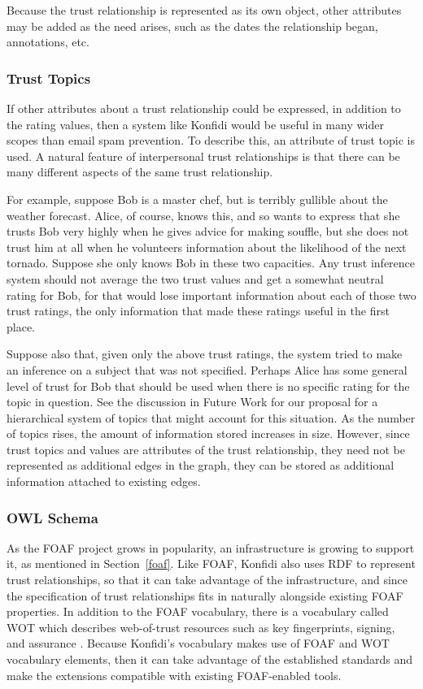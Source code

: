 \documentclass[letterpaper]{www2006-submission}
\begin{document}
Because the trust relationship is represented as its own object, other attributes may be added as the need arises, such as the dates the relationship began, annotations, etc. 

\subsubsection{Trust Topics}
If other attributes about a trust relationship could be expressed, in addition to the rating values, then a system like Konfidi would be useful in many wider scopes than email spam prevention.  To describe this, an attribute of trust topic is used.  A natural feature of interpersonal trust relationships is that there can be many different aspects of the same trust relationship.  

For example, suppose Bob is a master chef, but is terribly gullible about the weather forecast.  Alice, of course, knows this, and so wants to express that she trusts Bob very highly when he gives advice for making souffle, but she does not trust him at all when he volunteers information about the likelihood of the next tornado.  Suppose she only knows Bob in these two capacities.  Any trust inference system should not average the two trust values and get a somewhat neutral rating for Bob, for that would lose important information about each of those two trust ratings, the only information that made these ratings useful in the first place.

Suppose also that, given only the above trust ratings, the system tried to make an inference on a subject that was not specified.  Perhaps Alice has some general level of trust for Bob that should be used when there is no specific rating for the topic in question.  See the discussion in Future Work for our proposal for a hierarchical system of topics that might account for this situation.  As the number of topics rises, the amount of information stored increases in size.  However, since trust topics and values are attributes of the trust relationship, they need not be represented as additional edges in the graph, they can be stored as additional information attached to existing edges.

\subsubsection{OWL Schema}
\label{owlschema}
As the FOAF project grows in popularity, an infrastructure is growing to support it, as mentioned in Section~\ref{foaf}.  Like FOAF, Konfidi also uses RDF to represent trust relationships, so that it can take advantage of the infrastructure, and since the specification of trust relationships fits in naturally alongside existing FOAF properties.  In addition to the FOAF vocabulary, there is a vocabulary called WOT which describes web-of-trust resources such as key fingerprints, signing, and assurance \citep{wot}.  Because Konfidi's vocabulary makes use of FOAF and WOT vocabulary elements, then it can take advantage of the established standards and make the extensions compatible with existing FOAF-enabled tools.
\end{document}
